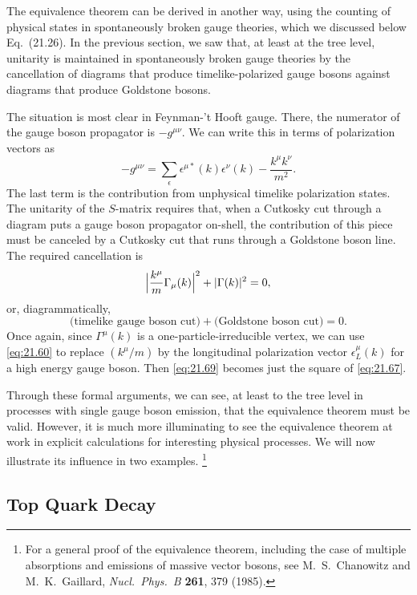 The equivalence theorem can be derived in another way, using the counting of
physical states in spontaneously broken gauge theories, which we discussed
below Eq.~(21.26).  In the previous section, we saw that, at least
at the tree level, unitarity is maintained in spontaneously broken gauge
theories by the cancellation of diagrams that produce timelike-polarized
gauge bosons against diagrams that produce Goldstone bosons.

The situation is most clear in Feynman-'t Hooft gauge.  There, the numerator
of the gauge boson propagator is $-g^{\mu\nu}$.  We can write this in terms
of polarization vectors as
\begin{equation}
  -g^{\mu\nu} = \sum_{\epsilon} \epsilon^{\mu*}(k)\epsilon^\nu(k)
    - \frac{k^\mu k^\nu}{m^2} .
  \label{eq:21.68}
\end{equation}
The last term is the contribution from unphysical timelike polarization
states.  The unitarity of the $S$-matrix requires that, when a Cutkosky cut
through a diagram puts a gauge boson propagator on-shell, the contribution of
this piece must be canceled by a Cutkosky cut that runs through a Goldstone
boson line.  The required cancellation is
\begin{equation}
  \Bigl| \frac{k^\mu}{m}\Gamma_\mu(k) \Bigr|^2 + |\Gamma(k)|^2 = 0 ,
  \label{eq:21.69}
\end{equation}
or, diagrammatically,
\begin{equation}
  \text{(timelike gauge boson cut)} + \text{(Goldstone boson cut)} = 0 .
\end{equation}
Once again, since $\Gamma^\mu(k)$ is a one-particle-irreducible vertex, we
can use \eqref{eq:21.60} to replace $(k^\mu/m)$ by the longitudinal
polarization vector $\epsilon^\mu_L(k)$ for a high energy gauge boson.  Then
\eqref{eq:21.69} becomes just the square of \eqref{eq:21.67}.

Through these formal arguments, we can see, at least to the tree level in
processes with single gauge boson emission, that the equivalence theorem must
be valid.  However, it is much more illuminating to see the equivalence
theorem at work in explicit calculations for interesting physical processes.
We will now illustrate its influence in two examples.%
\footnote{For a general proof of the equivalence theorem, including the case
of multiple absorptions and emissions of massive vector bosons, see
M.~S.~Chanowitz and M.~K.~Gaillard, \emph{Nucl.\ Phys.\ B} \textbf{261}, 379
(1985).}

\subsection{Top Quark Decay}

